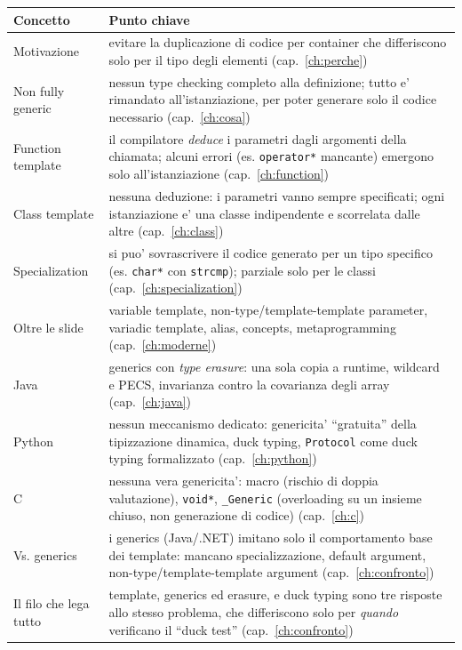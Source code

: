 \documentclass{report}
\newcommand{\code}[1]{\texttt{\small #1}}
\begin{document}
\begin{center}
\renewcommand{\arraystretch}{1.4}
\footnotesize
\begin{tabular}{|>{\raggedright\arraybackslash}p{3.2cm}|>{\raggedright\arraybackslash}p{9.5cm}|}
\hline
\textbf{Concetto} & \textbf{Punto chiave} \\
\hline
Motivazione & evitare la duplicazione di codice per container che differiscono solo per il tipo degli elementi (cap.~\ref{ch:perche}) \\
\hline
Non fully generic & nessun type checking completo alla definizione; tutto e' rimandato all'istanziazione, per poter generare solo il codice necessario (cap.~\ref{ch:cosa}) \\
\hline
Function template & il compilatore \emph{deduce} i parametri dagli argomenti della chiamata; alcuni errori (es. \code{operator*} mancante) emergono solo all'istanziazione (cap.~\ref{ch:function}) \\
\hline
Class template & nessuna deduzione: i parametri vanno sempre specificati; ogni istanziazione e' una classe indipendente e scorrelata dalle altre (cap.~\ref{ch:class}) \\
\hline
Specialization & si puo' sovrascrivere il codice generato per un tipo specifico (es. \code{char*} con \code{strcmp}); parziale solo per le classi (cap.~\ref{ch:specialization}) \\
\hline
Oltre le slide & variable template, non-type/template-template parameter, variadic template, alias, concepts, metaprogramming (cap.~\ref{ch:moderne}) \\
\hline
Java & generics con \emph{type erasure}: una sola copia a runtime, wildcard e PECS, invarianza contro la covarianza degli array (cap.~\ref{ch:java}) \\
\hline
Python & nessun meccanismo dedicato: genericita' ``gratuita'' della tipizzazione dinamica, duck typing, \code{Protocol} come duck typing formalizzato (cap.~\ref{ch:python}) \\
\hline
C & nessuna vera genericita': macro (rischio di doppia valutazione), \code{void*}, \code{\_Generic} (overloading su un insieme chiuso, non generazione di codice) (cap.~\ref{ch:c}) \\
\hline
Vs. generics & i generics (Java/.NET) imitano solo il comportamento base dei template: mancano specializzazione, default argument, non-type/template-template argument (cap.~\ref{ch:confronto}) \\
\hline
Il filo che lega tutto & template, generics ed erasure, e duck typing sono tre risposte allo stesso problema, che differiscono solo per \emph{quando} verificano il ``duck test'' (cap.~\ref{ch:confronto}) \\
\hline
\end{tabular}
\end{center}
\end{document}
